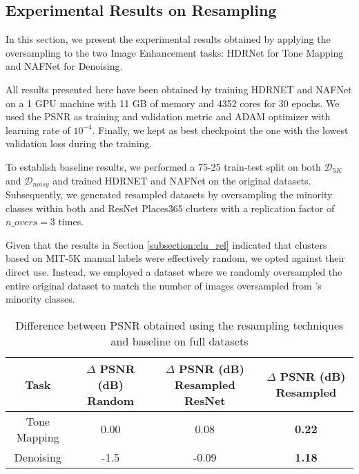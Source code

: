 \documentclass[12pt]{spieman}  %
\begin{document}
\begin{spacing}{2}
\begin{linenumbers}
\section{Experimental Results on Resampling}
\label{sec:results_resampling}
In this section, we present the experimental results obtained by applying the oversampling  to the two Image Enhancement tasks: HDRNet for Tone Mapping and  NAFNet for Denoising. 


{All results presented here have been obtained by training HDRNET and NAFNet on a 1 GPU machine with 11 GB of memory and 4352 cores for $30$ epochs. We used the PSNR as training and validation metric and ADAM optimizer with learning rate of $10^{-4}$. Finally, we kept as best checkpoint the one with the lowest validation loss during the training.}  



To establish baseline results, we performed a 75-25 train-test split on both $\mathcal{D}_{5K}$ and $\mathcal{D}_{noisy}$ and trained HDRNET and NAFNet on the original datasets. Subsequently, we generated resampled datasets by oversampling the minority classes within both \clustname and ResNet Places365 clusters with a replication factor of $n\_overs=3$ times.
 

Given that the results in Section \ref{subsection:clu_rel} indicated that clusters based on MIT-5K manual labels were effectively random, we opted against their direct use. Instead, we employed a dataset where we randomly oversampled the entire original dataset to match the number of images oversampled from \clustname's minority classes.       



 


\begin{table}[!t]
	\renewcommand{\arraystretch}{1.3}
	\caption{Difference between PSNR obtained using the resampling techniques and baseline on full datasets}
	\centering
	\begin{tabular}{c||c|c|c}
	Task  & \makecell{$\Delta$ PSNR (dB) \\ Random }  & \makecell{$\Delta$ PSNR (dB) \\Resampled ResNet } & \makecell{$\Delta$ PSNR (dB) \\ Resampled \clustname}\\
	\hline \hline
	Tone Mapping  & 0.00 & 0.08 & \textbf{0.22} \\
	Denoising  & -1.5 &   -0.09 & \textbf{1.18} \\
	\end{tabular}
	\label{table:results_resampling}
	\end{table}
	

\end{linenumbers}
\end{spacing}
\end{document}
